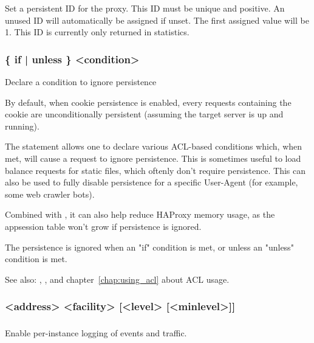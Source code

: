   Set a persistent ID for the proxy. This ID must be unique and positive.
  An unused ID will automatically be assigned if unset. The first assigned
  value will be 1. This ID is currently only returned in statistics.

\subsubsection[ignore-persist]{ \{ if | unless \} <condition>}

  Declare a condition to ignore persistence


  By default, when cookie persistence is enabled, every requests containing
  the cookie are unconditionally persistent (assuming the target server is up
  and running).

  The  statement allows one to declare various ACL-based
  conditions which, when met, will cause a request to ignore persistence.
  This is sometimes useful to load balance requests for static files, which
  oftenly don't require persistence. This can also be used to fully disable
  persistence for a specific User-Agent (for example, some web crawler bots).

  Combined with , it can also help reduce HAProxy memory usage, as
  the appsession table won't grow if persistence is ignored.

  The persistence is ignored when an "if" condition is met, or unless an
  "unless" condition is met.

  See also: , , and chapter~\ref{chap:using_acl} about ACL usage.

\subsubsection[log global]{}
\subsubsection[log]{ <address> <facility> [<level> [<minlevel>]]}
\subsubsection[no log]{}


  Enable per-instance logging of events and traffic.
  
